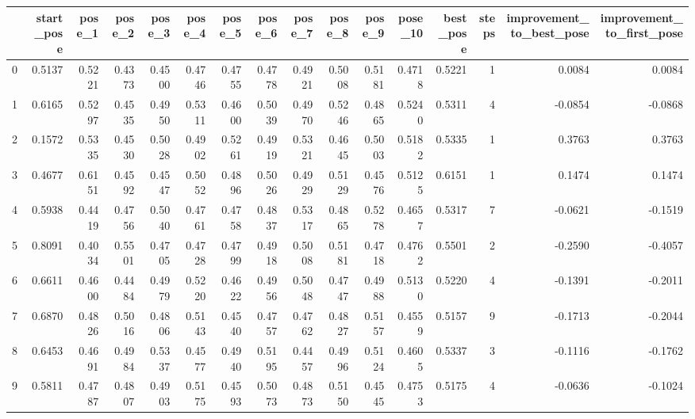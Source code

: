 \begin{tabular}{lrrrrrrrrrrrrrrr}
\toprule
{} &  start\_pose &  pose\_1 &  pose\_2 &  pose\_3 &  pose\_4 &  pose\_5 &  pose\_6 &  pose\_7 &  pose\_8 &  pose\_9 &  pose\_10 &  best\_pose &  steps &  improvement\_to\_best\_pose &  improvement\_to\_first\_pose \\
\midrule
0   &      0.5137 &  0.5221 &  0.4373 &  0.4500 &  0.4746 &  0.4755 &  0.4778 &  0.4921 &  0.5008 &  0.5181 &   0.4718 &     0.5221 &      1 &                    0.0084 &                     0.0084 \\
1   &      0.6165 &  0.5297 &  0.4535 &  0.4950 &  0.5311 &  0.4600 &  0.5039 &  0.4970 &  0.5246 &  0.4865 &   0.5240 &     0.5311 &      4 &                   -0.0854 &                    -0.0868 \\
2   &      0.1572 &  0.5335 &  0.4530 &  0.5028 &  0.4902 &  0.5261 &  0.4919 &  0.5321 &  0.4645 &  0.5003 &   0.5182 &     0.5335 &      1 &                    0.3763 &                     0.3763 \\
3   &      0.4677 &  0.6151 &  0.4592 &  0.4547 &  0.5052 &  0.4896 &  0.5026 &  0.4929 &  0.5129 &  0.4576 &   0.5125 &     0.6151 &      1 &                    0.1474 &                     0.1474 \\
4   &      0.5938 &  0.4419 &  0.4756 &  0.5040 &  0.4761 &  0.4758 &  0.4837 &  0.5317 &  0.4865 &  0.5278 &   0.4657 &     0.5317 &      7 &                   -0.0621 &                    -0.1519 \\
5   &      0.8091 &  0.4034 &  0.5501 &  0.4705 &  0.4728 &  0.4799 &  0.4918 &  0.5008 &  0.5181 &  0.4718 &   0.4762 &     0.5501 &      2 &                   -0.2590 &                    -0.4057 \\
6   &      0.6611 &  0.4600 &  0.4484 &  0.4979 &  0.5220 &  0.4622 &  0.4956 &  0.5048 &  0.4747 &  0.4988 &   0.5130 &     0.5220 &      4 &                   -0.1391 &                    -0.2011 \\
7   &      0.6870 &  0.4826 &  0.5016 &  0.4806 &  0.5143 &  0.4540 &  0.4757 &  0.4762 &  0.4827 &  0.5157 &   0.4559 &     0.5157 &      9 &                   -0.1713 &                    -0.2044 \\
8   &      0.6453 &  0.4691 &  0.4984 &  0.5337 &  0.4577 &  0.4940 &  0.5195 &  0.4457 &  0.4996 &  0.5124 &   0.4605 &     0.5337 &      3 &                   -0.1116 &                    -0.1762 \\
9   &      0.5811 &  0.4787 &  0.4807 &  0.4903 &  0.5175 &  0.4593 &  0.5073 &  0.4873 &  0.5150 &  0.4545 &   0.4753 &     0.5175 &      4 &                   -0.0636 &                    -0.1024 \\

\end{tabular}
